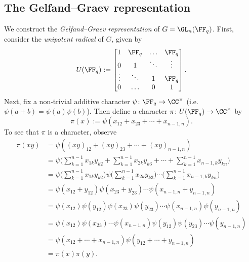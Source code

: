 \subsection{The Gelfand--Graev representation}\label{Section2.4}
We construct the \emph{Gelfand--Graev representation} of $G=\GL_n(\FF_q)$.
First, consider the \emph{unipotent radical} of $G$, given by
\[
    U(\FF_q) := \begin{bmatrix}
        1      & \FF_q  & \hdots & \FF_q  \\
        0      & 1      & \ddots & \vdots \\
        \vdots & \ddots & 1      & \FF_q  \\
        0      & \hdots & 0      & 1
    \end{bmatrix}.
\]
Next, fix a non-trivial additive character $\psi\colon \FF_q\to\CC^\times$ (i.e.\ $\psi(a+b)=\psi(a)\psi(b)$).
Then define a character $\pi\colon U(\FF_q)\to\CC^\times$ by
\[
    \pi(x) := \psi(x_{12}+x_{23}+\cdots+x_{n-1,n}).
\]
To see that $\pi$ is a character, observe
\begin{align*}
    \pi(xy) & = \psi((xy)_{12} + (xy)_{23} + \cdots + (xy)_{n-1,n})                                                                                          \\
            & = \psi\bigg(\sum_{k=1}^{n-1} x_{1k}y_{k2} + \sum_{k=1}^{n-1} x_{2k}y_{k3} + \cdots + \sum_{k=1}^{n-1} x_{n-1,k}y_{kn}\bigg)                    \\
            & = \psi\bigg(\sum_{k=1}^{n-1} x_{1k}y_{k2}\bigg)\psi\bigg(\sum_{k=1}^{n-1} x_{2k}y_{k3}\bigg)\cdots\bigg(\sum_{k=1}^{n-1} x_{n-1,k}y_{kn}\bigg) \\
            & = \psi(x_{12}+y_{12})\psi(x_{23}+y_{23})\cdots\psi(x_{n-1,n}+y_{n-1,n})                                                                        \\
            & = \psi(x_{12})\psi(y_{12})\psi(x_{23})\psi(y_{23})\cdots\psi(x_{n-1,n})\psi(y_{n-1,n})                                                         \\
            & = \psi(x_{12})\psi(x_{23})\cdots\psi(x_{n-1,n})\psi(y_{12})\psi(y_{23})\cdots\psi(y_{n-1,n})                                                   \\
            & = \psi(x_{12} + \cdots + x_{n-1,n})\psi(y_{12} + \cdots + y_{n-1,n})                                                                           \\
            & = \pi(x)\pi(y).
\end{align*}
